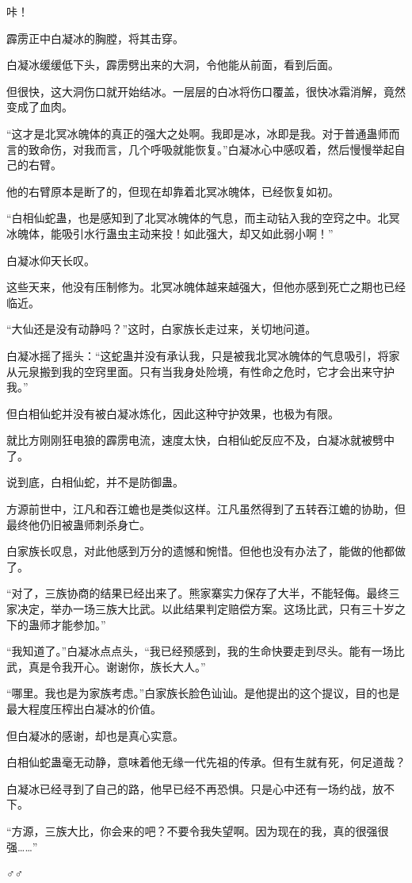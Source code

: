 \begin{this_body}
咔！

霹雳正中白凝冰的胸膛，将其击穿。

白凝冰缓缓低下头，霹雳劈出来的大洞，令他能从前面，看到后面。

但很快，这大洞伤口就开始结冰。一层层的白冰将伤口覆盖，很快冰霜消解，竟然变成了血肉。

“这才是北冥冰魄体的真正的强大之处啊。我即是冰，冰即是我。对于普通蛊师而言的致命伤，对我而言，几个呼吸就能恢复。”白凝冰心中感叹着，然后慢慢举起自己的右臂。

他的右臂原本是断了的，但现在却靠着北冥冰魄体，已经恢复如初。

“白相仙蛇蛊，也是感知到了北冥冰魄体的气息，而主动钻入我的空窍之中。北冥冰魄体，能吸引水行蛊虫主动来投！如此强大，却又如此弱小啊！”

白凝冰仰天长叹。

这些天来，他没有压制修为。北冥冰魄体越来越强大，但他亦感到死亡之期也已经临近。

“大仙还是没有动静吗？”这时，白家族长走过来，关切地问道。

白凝冰摇了摇头：“这蛇蛊并没有承认我，只是被我北冥冰魄体的气息吸引，将家从元泉搬到我的空窍里面。只有当我身处险境，有性命之危时，它才会出来守护我。”

但白相仙蛇并没有被白凝冰炼化，因此这种守护效果，也极为有限。

就比方刚刚狂电狼的霹雳电流，速度太快，白相仙蛇反应不及，白凝冰就被劈中了。

说到底，白相仙蛇，并不是防御蛊。

方源前世中，江凡和吞江蟾也是类似这样。江凡虽然得到了五转吞江蟾的协助，但最终他仍旧被蛊师刺杀身亡。

白家族长叹息，对此他感到万分的遗憾和惋惜。但他也没有办法了，能做的他都做了。

“对了，三族协商的结果已经出来了。熊家寨实力保存了大半，不能轻侮。最终三家决定，举办一场三族大比武。以此结果判定赔偿方案。这场比武，只有三十岁之下的蛊师才能参加。”

“我知道了。”白凝冰点点头，“我已经预感到，我的生命快要走到尽头。能有一场比武，真是令我开心。谢谢你，族长大人。”

“哪里。我也是为家族考虑。”白家族长脸色讪讪。是他提出的这个提议，目的也是最大程度压榨出白凝冰的价值。

但白凝冰的感谢，却也是真心实意。

白相仙蛇蛊毫无动静，意味着他无缘一代先祖的传承。但有生就有死，何足道哉？

白凝冰已经寻到了自己的路，他早已经不再恐惧。只是心中还有一场约战，放不下。

“方源，三族大比，你会来的吧？不要令我失望啊。因为现在的我，真的很强很强……”

♂♂

\end{this_body}

